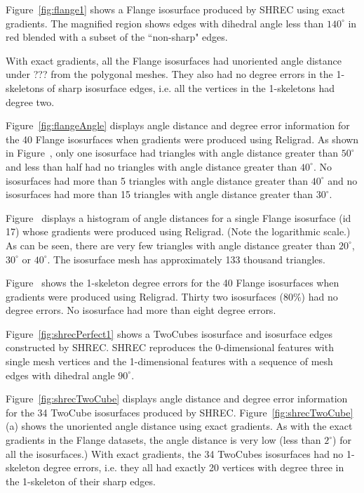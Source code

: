 Figure~\ref{fig:flange1} shows a Flange isosurface produced by SHREC
using exact gradients.
The magnified region shows edges with dihedral angle
less than $140^\circ$ in red blended with a subset of the ``non-sharp"
edges.

With exact gradients,
all the Flange isosurfaces had unoriented angle distance
under ??? from the polygonal meshes.
They also had no degree errors in the 1-skeletons
of sharp isosurface edges,
i.e. all the vertices in the 1-skeletons had degree two.

Figure~\ref{fig:flangeAngle} displays angle distance and degree error
information for the 40 Flange isosurfaces
when gradients were produced using Religrad.
As shown in Figure~,
only one isosurface had triangles with angle distance greater than $50^\circ$
and less than half had no triangles with angle distance greater than $40^\circ$.
No isosurfaces had more than 5 triangles with angle distance
greater than $40^\circ$
and no isosurfaces had more than 15 triangles with angle distance greater
than $30^\circ$.

Figure~ displays a histogram of angle distances
for a single Flange isosurface (id 17) 
whose gradients were produced using Religrad.
(Note the logarithmic scale.)
As can be seen,
there are very few triangles with angle distance
greater than $20^\circ$, $30^\circ$ or $40^\circ$.
The isosurface mesh has approximately 133
thousand triangles. 

Figure~\protect{} shows the 1-skeleton degree errors
for the 40 Flange isosurfaces when gradients were produced using Religrad.
Thirty two isosurfaces (80$\%$) had no degree errors.
No isosurface had more than eight degree errors.

Figure~\ref{fig:shrecPerfect1} shows a TwoCubes isosurface
and isosurface edges constructed by SHREC.
SHREC reproduces the 0-dimensional features with single mesh vertices
and the 1-dimensional features with a sequence of mesh edges
with dihedral angle $90^\circ$.

Figure~\ref{fig:shrecTwoCube} displays angle distance and degree error
information for the 34 TwoCube isosurfaces produced by SHREC.
Figure~\ref{fig:shrecTwoCube}(a) shows the unoriented angle distance
using exact gradients.
As with the exact gradients in the Flange datasets,
the angle distance is very low (less than $2^\circ$)
for all the isosurfaces.)
With exact gradients, the 34 TwoCubes isosurfaces 
had no 1-skeleton degree errors, 
i.e. they all had exactly 20 vertices with degree three 
in the 1-skeleton of their sharp edges.

